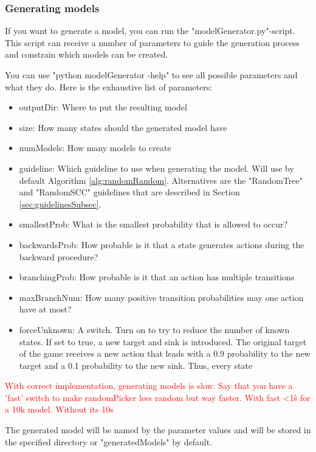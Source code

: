 \subsubsection*{Generating models}
If you want to generate a model, you can run the "modelGenerator.py"-script.
This script can receive a number of parameters to guide the generation process and constrain which models can be created.

You can use "python modelGenerator -help" to see all possible parameters and what they do.
Here is the exhaustive list of parameters:
\begin{itemize} \label{list:params}
    \item outputDir: Where to put the resulting model
    \item size: How many states should the generated model have
    \item numModels: How many models to create
    \item guideline: Which guideline to use when generating the model. Will use by default Algorithm \ref{alg:randomRandom}.
    Alternatives are the "RandomTree" and "RandomSCC" guidelines that are described in Section \ref{sec:guidelinesSubsec}.
    \item smallestProb: What is the smallest probability that is allowed to occur?
    \item backwardsProb: How probable is it that a state generates actions during the backward procedure?
    \item branchingProb: How probable is it that an action has multiple transitions
    \item maxBranchNum: How many positive transition probabilities may one action have at most?
    \item forceUnknown: A switch. Turn on to try to reduce the number of known states. 
    If set to true, a new target and sink is introduced. The original target of the game receives a new action that leads with a 0.9 probability to the new target and a 0.1 probability to the new sink.
    Thus, every state 
\end{itemize}
\textcolor{red}{With correct implementation, generating models is slow. Say that you have a 'fast' switch to make randomPicker less random but way faster.
With fast <1ŝ for a 10k model. Without its 10s}

The generated model will be named by the parameter values and will be stored in the specified directory or "generatedModels" by default.

